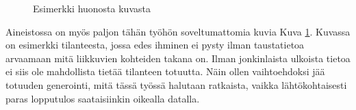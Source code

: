 \begin{figure}[h]
\centering
{}
\caption{Esimerkki huonosta kuvasta}
\label{fig:extreme}
\end{figure}

    
Aineistossa on myös paljon tähän työhön soveltumattomia kuvia Kuva \ref{fig:extreme}.
Kuvassa on esimerkki tilanteesta, jossa edes ihminen ei pysty ilman taustatietoa arvaamaan mitä liikkuvien kohteiden takana on.
Ilman jonkinlaista ulkoista tietoa ei  siis ole mahdollista tietää tilanteen totuutta.
Näin ollen vaihtoehdoksi jää totuuden generointi, mitä tässä työssä halutaan ratkaista,
vaikka lähtökohtaisesti paras lopputulos saataisiinkin oikealla datalla.
